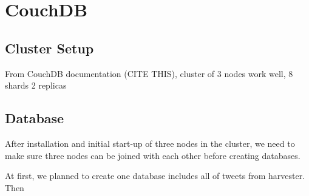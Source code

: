 \section{CouchDB}
\subsection{Cluster Setup}
 From CouchDB documentation (CITE THIS), cluster of 3 nodes work well, 8 shards 2 replicas 

\subsection{Database} 
After installation and initial start-up of three nodes in the cluster, we need to make sure three nodes can be joined with each other before creating databases. 

At first, we planned to create one database includes all of tweets from harvester. Then 
